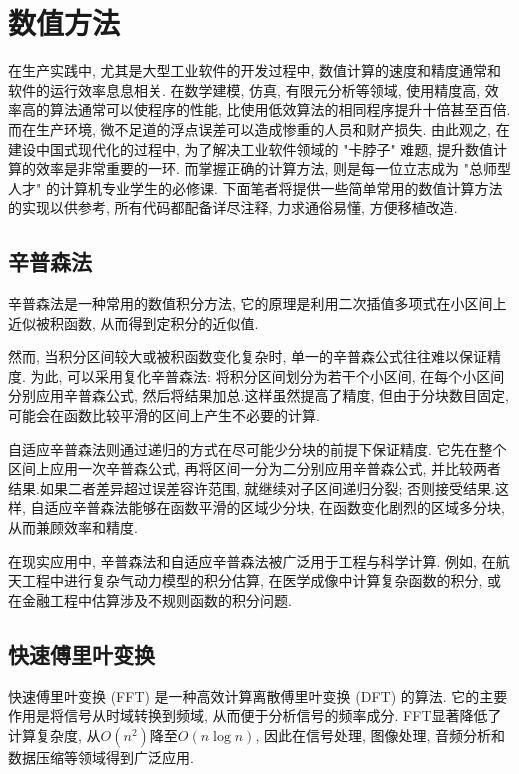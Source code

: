 \documentclass[a4paper]{ctexbook}
\begin{document}


\chapter{数值方法}

在生产实践中, 尤其是大型工业软件的开发过程中, 数值计算的速度和精度通常和软件的运行效率息息相关. 在数学建模, 仿真, 有限元分析等领域, 使用精度高, 效率高的算法通常可以使程序的性能, 比使用低效算法的相同程序提升十倍甚至百倍. 而在生产环境, 微不足道的浮点误差可以造成惨重的人员和财产损失. 由此观之, 在建设中国式现代化的过程中, 为了解决工业软件领域的 "卡脖子" 难题, 提升数值计算的效率是非常重要的一环. 而掌握正确的计算方法, 则是每一位立志成为 "总师型人才" 的计算机专业学生的必修课. 下面笔者将提供一些简单常用的数值计算方法的实现以供参考, 所有代码都配备详尽注释, 力求通俗易懂, 方便移植改造.

\section{辛普森法}

辛普森法是一种常用的数值积分方法, 它的原理是利用二次插值多项式在小区间上近似被积函数, 从而得到定积分的近似值.

然而, 当积分区间较大或被积函数变化复杂时, 单一的辛普森公式往往难以保证精度. 为此, 可以采用复化辛普森法: 将积分区间划分为若干个小区间, 在每个小区间分别应用辛普森公式, 然后将结果加总.这样虽然提高了精度, 但由于分块数目固定, 可能会在函数比较平滑的区间上产生不必要的计算.

自适应辛普森法则通过递归的方式在尽可能少分块的前提下保证精度. 它先在整个区间上应用一次辛普森公式, 再将区间一分为二分别应用辛普森公式, 并比较两者结果.如果二者差异超过误差容许范围, 就继续对子区间递归分裂; 否则接受结果.这样, 自适应辛普森法能够在函数平滑的区域少分块, 在函数变化剧烈的区域多分块, 从而兼顾效率和精度.

在现实应用中, 辛普森法和自适应辛普森法被广泛用于工程与科学计算. 例如, 在航天工程中进行复杂气动力模型的积分估算, 在医学成像中计算复杂函数的积分, 或在金融工程中估算涉及不规则函数的积分问题.



\section{快速傅里叶变换}

快速傅里叶变换 (FFT) 是一种高效计算离散傅里叶变换 (DFT) 的算法. 它的主要作用是将信号从时域转换到频域, 从而便于分析信号的频率成分. FFT显著降低了计算复杂度, 从$O(n^2)$降至$O(n \log n)$, 因此在信号处理, 图像处理, 音频分析和数据压缩等领域得到广泛应用.
\end{document}
